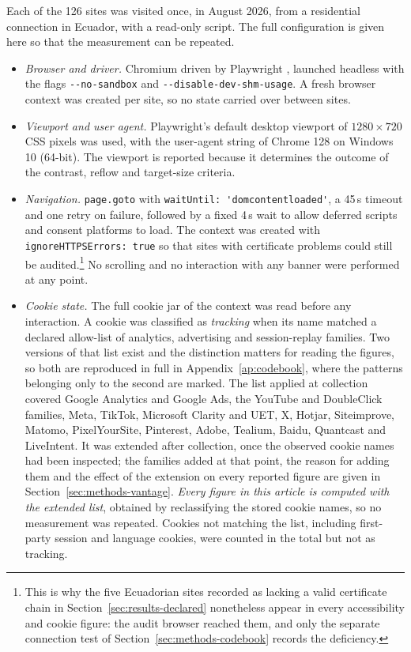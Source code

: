 \documentclass[pdflatex,sn-basic,Numbered,iicol]{sn-jnl}
\theoremstyle{thmstyleone}
\theoremstyle{thmstyletwo}
\theoremstyle{thmstylethree}
\begin{document}
Each of the 126 sites was visited once, in August 2026, from a residential connection in Ecuador, with a read-only script. The full configuration is given here so that the measurement can be repeated.

\begin{itemize}
	\item \emph{Browser and driver.} Chromium driven by Playwright \citep{playwright2026}, launched headless with the flags \verb|--no-sandbox| and \verb|--disable-dev-shm-usage|. A fresh browser context was created per site, so no state carried over between sites.
	\item \emph{Viewport and user agent.} Playwright's default desktop viewport of $1280 \times 720$ CSS pixels was used, with the user-agent string of Chrome 128 on Windows 10 (64-bit). The viewport is reported because it determines the outcome of the contrast, reflow and target-size criteria.
	\item \emph{Navigation.} \verb|page.goto| with \verb|waitUntil: 'domcontentloaded'|, a 45\,s timeout and one retry on failure, followed by a fixed 4\,s wait to allow deferred scripts and consent platforms to load. The context was created with \verb|ignoreHTTPSErrors: true| so that sites with certificate problems could still be audited.\footnote{This is why the five Ecuadorian sites recorded as lacking a valid certificate chain in Section~\ref{sec:results-declared} nonetheless appear in every accessibility and cookie figure: the audit browser reached them, and only the separate connection test of Section~\ref{sec:methods-codebook} records the deficiency.} No scrolling and no interaction with any banner were performed at any point.
	\item \emph{Cookie state.} The full cookie jar of the context was read before any interaction. A cookie was classified as \emph{tracking} when its name matched a declared allow-list of analytics, advertising and session-replay families. Two versions of that list exist and the distinction matters for reading the figures, so both are reproduced in full in Appendix~\ref{ap:codebook}, where the patterns belonging only to the second are marked. The list applied at collection covered Google Analytics and Google Ads, the YouTube and DoubleClick families, Meta, TikTok, Microsoft Clarity and UET, X, Hotjar, Siteimprove, Matomo, PixelYourSite, Pinterest, Adobe, Tealium, Baidu, Quantcast and LiveIntent. It was extended after collection, once the observed cookie names had been inspected; the families added at that point, the reason for adding them and the effect of the extension on every reported figure are given in Section~\ref{sec:methods-vantage}. \emph{Every figure in this article is computed with the extended list}, obtained by reclassifying the stored cookie names, so no measurement was repeated. Cookies not matching the list, including first-party session and language cookies, were counted in the total but not as tracking.

\end{itemize}
\end{document}
